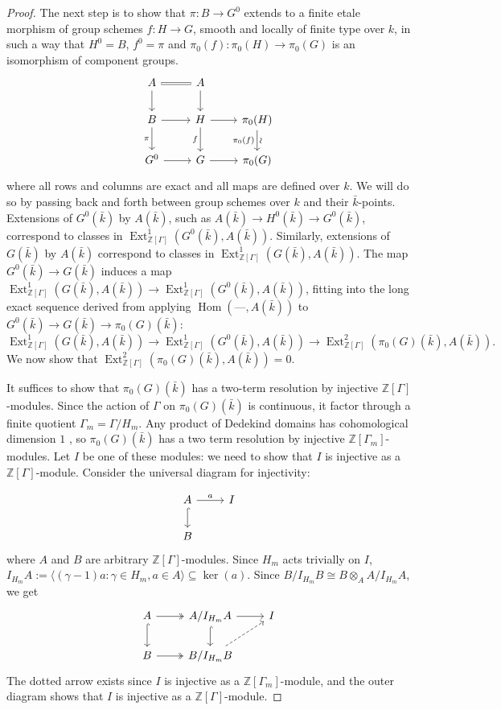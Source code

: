 \documentclass[11pt]{amsart}
\theoremstyle{plain}
\theoremstyle{definition}
\theoremstyle{remark}
\newcommand{\ZZ}{{\mathbb{Z}}}
\newcommand{\bFq}{\bar{k}}
\newcommand{\Fq}{k}
\DeclareMathOperator{\Hom}{Hom}
\DeclareMathOperator{\Ext}{Ext}
\begin{document}
\begin{proof}
  The next step is to show that $\pi: B \to G^0$ extends to a finite
  etale morphism of group schemes $f: H\to G$, smooth and locally of
  finite type over $\Fq$, in such a way that $H^0 = B$, $f^0 =\pi$ and
  $\pi_0(f) : \pi_0(H)\to \pi_0(G)$ is an isomorphism of component
  groups.
  \begin{equation}\label{extension-diagram}
  \begin{tikzcd}
  A \arrow[equal]{r} \dar & A \dar \\
  B \rar \dar[swap]{\pi} & H \rar \dar[swap]{f} & \pi_0(H) \arrow{d}[below,rotate=90]{\sim}[swap]{\pi_0(f)} \\
  G^0 \rar & G \rar & \pi_0(G)
  \end{tikzcd}
  \end{equation}
  where all rows and columns are exact and all maps are defined over
  $\Fq$.  We will do so by passing back and forth between group
  schemes over $\Fq$ and their $\bFq$-points.  Extensions of
  $G^0(\bFq)$ by $A(\bFq)$, such as $A(\bFq) \to H^0(\bFq) \to G^0(\bFq)$,
  correspond to classes in $\Ext^1_{\ZZ[\Gamma]}(G^0(\bFq), A(\bFq))$.
  Similarly, extensions of $G(\bFq)$ by $A(\bFq)$ correspond to
  classes in $\Ext^1_{\ZZ[\Gamma]}(G(\bFq), A(\bFq))$.  The map
  $G^0(\bFq) \to G(\bFq)$ induces a map
  $\Ext^1_{\ZZ[\Gamma]}(G(\bFq), A(\bFq)) \to \Ext^1_{\ZZ[\Gamma]}(G^0(\bFq), A(\bFq))$,
  fitting into the long exact sequence derived from applying
  $\Hom(\mbox{---}, A(\bFq))$ to $G^0(\bFq) \to G(\bFq) \to \pi_0(G)(\bFq)$:
  $$\Ext^1_{\ZZ[\Gamma]}(G(\bFq), A(\bFq)) \to \Ext^1_{\ZZ[\Gamma]}(G^0(\bFq), A(\bFq)) \to \Ext^2_{\ZZ[\Gamma]}(\pi_0(G)(\bFq), A(\bFq)).$$
  We now show that $\Ext^2_{\ZZ[\Gamma]}(\pi_0(G)(\bFq), A(\bFq)) = 0$.

  It suffices to show that $\pi_0(G)(\bFq)$ has a two-term resolution
  by injective $\ZZ[\Gamma]$-modules.  Since the action of $\Gamma$ on
  $\pi_0(G)(\bFq)$ is continuous, it factor through a finite quotient
  $\Gamma_m = \Gamma / H_m$.  Any product of Dedekind domains has
  cohomological dimension $1$ \cite[?]{?}, so $\pi_0(G)(\bFq)$ has a
  two term resolution by injective $\ZZ[\Gamma_m]$-modules.  Let $I$
  be one of these modules: we need to show that $I$ is injective as a
  $\ZZ[\Gamma]$-module.  Consider the universal diagram for injectivity:
  
  \[
  \begin{tikzcd}
  A \rar{a} \arrow[hook]{d} & I \\
  B
  \end{tikzcd}
  \]
  where $A$ and $B$ are arbitrary $\ZZ[\Gamma]$-modules.  Since $H_m$ acts trivially on $I$,
  $I_{H_m}A := \langle (\gamma-1)a : \gamma \in H_m, a \in A \rangle \subseteq \ker(a).$
  Since $B / I_{H_m}B \cong B \otimes_A A / I_{H_m}A$, we get
  \[
  \begin{tikzcd}
  A \arrow[two heads]{r} \arrow[hook]{d} & A/I_{H_m}A \rar \arrow[hook]{d} & I \\
  B \arrow[two heads]{r} & B/I_{H_m}B \arrow[dashed]{ur} & {}
  \end{tikzcd}
  \]
  The dotted arrow exists since $I$ is injective as a
  $\ZZ[\Gamma_m]$-module, and the outer diagram shows that $I$ is
  injective as a $\ZZ[\Gamma]$-module.


\end{proof}
\end{document}
